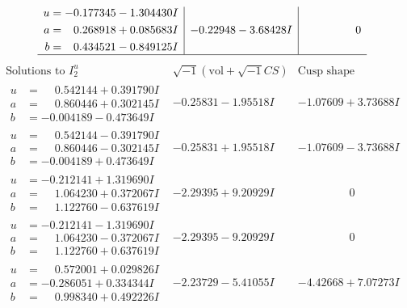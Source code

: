 \documentclass[1p]{elsarticle_modified}
\theoremstyle{definition}
\newcommand{\I}{\sqrt{-1}}
\begin{document}
$$\begin{array}{c|c|c}
\begin{aligned}
u &= -0.177345 - 1.304430 I \\
a &= \phantom{-}0.268918 + 0.085683 I \\
b &= \phantom{-}0.434521 - 0.849125 I\end{aligned}
 & -0.22948 - 3.68428 I & \phantom{-0.000000 } 0\\
 \hline 
 \end{array}$$\newpage$$\begin{array}{c|c|c}  
\text{Solutions to }I^u_{2}& \I (\text{vol} + \sqrt{-1}CS) & \text{Cusp shape}\\
 \hline 
\begin{aligned}
u &= \phantom{-}0.542144 + 0.391790 I \\
a &= \phantom{-}0.860446 + 0.302145 I \\
b &= -0.004189 - 0.473649 I\end{aligned}
 & -0.25831 - 1.95518 I & -1.07609 + 3.73688 I \\ \hline\begin{aligned}
u &= \phantom{-}0.542144 - 0.391790 I \\
a &= \phantom{-}0.860446 - 0.302145 I \\
b &= -0.004189 + 0.473649 I\end{aligned}
 & -0.25831 + 1.95518 I & -1.07609 - 3.73688 I \\ \hline\begin{aligned}
u &= -0.212141 + 1.319690 I \\
a &= \phantom{-}1.064230 + 0.372067 I \\
b &= \phantom{-}1.122760 - 0.637619 I\end{aligned}
 & -2.29395 + 9.20929 I & \phantom{-0.000000 } 0 \\ \hline\begin{aligned}
u &= -0.212141 - 1.319690 I \\
a &= \phantom{-}1.064230 - 0.372067 I \\
b &= \phantom{-}1.122760 + 0.637619 I\end{aligned}
 & -2.29395 - 9.20929 I & \phantom{-0.000000 } 0 \\ \hline\begin{aligned}
u &= \phantom{-}0.572001 + 0.029826 I \\
a &= -0.286051 + 0.334344 I \\
b &= \phantom{-}0.998340 + 0.492226 I\end{aligned}
 & -2.23729 - 5.41055 I & -4.42668 + 7.07273 I \\ \hline\begin{aligned}

\end{aligned}
\end{array}$$
\end{document}
